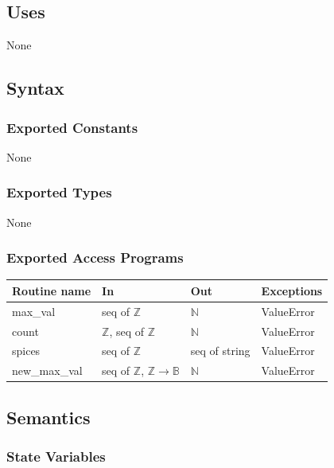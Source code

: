 \documentclass[12pt,fleqn]{examtst}
\begin{document}
\subsection* {Uses}

None

\subsection* {Syntax}

\subsubsection* {Exported Constants}

None

\subsubsection* {Exported Types}

None 

\subsubsection* {Exported Access Programs}

\begin{tabular}{| l | l | l | p{5cm} |}
\hline
\textbf{Routine name} & \textbf{In} & \textbf{Out} & \textbf{Exceptions}\\
\hline
max\_val & seq of $\mathbb{Z}$ & $\mathbb{N}$ & ValueError\\
  \hline
count & $\mathbb{Z}$, seq of $\mathbb{Z}$ & $\mathbb{N}$ & ValueError\\
\hline
spices & seq of $\mathbb{Z}$ & seq of string & ValueError\\
\hline
new\_max\_val & seq of $\mathbb{Z}$, $\mathbb{Z} \rightarrow \mathbb{B}$ &
                                                                           $\mathbb{N}$ & ValueError\\
\hline
  
\end{tabular}

\subsection* {Semantics}

\subsubsection* {State Variables}
\end{document}
